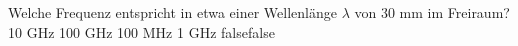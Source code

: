     {Welche Frequenz entspricht in etwa einer Wellenlänge $\lambda$ von 30 mm im Freiraum?}
    {10 GHz}
    {100 GHz}
    {100 MHz}
    {1 GHz}
    {false}{false}